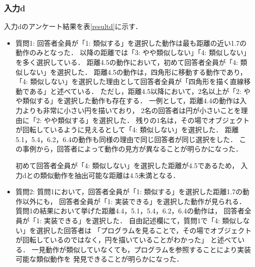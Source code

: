 \documentclass[11pt]{jreport}
\begin{document}
\subsubsection{入力d}
入力dのアンケート結果を表\ref{resultd}に示す．

\begin{itemize}
    \item 質問1: 回答者全員が「1: 類似する」を選択した動作は最も距離の近い1.7の動作のみとなった．
    以降の距離では「3: やや類似しない」「4: 類似しない」を多く選択している．
    距離4.5の動作において，初めて回答者全員が「4: 類似しない」を選択した．
    距離4.5の動作は，四角形に移動する動作であり，
    「4: 類似しない」を選択した理由として回答者全員が「四角形を描く直線移動である」と述べている．
    ただし，距離4.5以降において，2名以上が「2: やや類似する」を選択した動作も存在する．
    一例として，距離4.4の動作は入力よりも非常に小さい円を描いており，
    2名の回答者は円が小さいことを理由に「2: やや類似する」を選択した．
    残りの1名は，その場でオブジェクトが回転しているように見えるとして「4: 類似しない」を選択した．
    距離5.1，5.4，6.2，6.4の動作も同様の理由で同じ回答者が同じ選択をした．
    この事例から，回答者によって動作の見方が異なることが明らかになった．
    
    初めて回答者全員が「4: 類似しない」を選択した距離が4.5であるため，
    入力dとの類似動作を抽出可能な距離は4.5未満となる．

    \item 質問2: 質問1において，回答者全員が「1: 類似する」を選択した距離1.7の動作以外にも，
    回答者全員が「1: 実装できる」を選択した動作が見られる．
    質問1の結果において挙げた距離4.4，5.1，5.4，6.2，6.4の動作は，
    回答者全員が「1: 実装できる」を選択した．
    自由記述欄にて，質問1で「4: 類似しない」を選択した回答者は
    「プログラムを見ることで，その場でオブジェクトが回転しているのではなく，円を描いていることがわかった」
    と述べている．
    一見動作が類似していなくても，プログラムを参照することにより実装可能な類似動作を
    発見できることが明らかになった．
\end{itemize}
\end{document}

